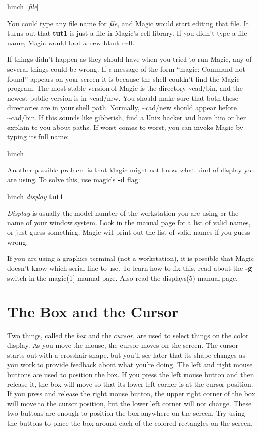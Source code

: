 \documentclass[letterpaper,twoside,12pt]{article}
\def\hinch{\hspace*{0.5in}}
\def\starti{\begin{center}\begin{tabbing}\hinch\=\hinch\=\hinch\=hinch\hinch\=\kill}
\def\endi{\end{tabbing}\end{center}}
\def\ii{\>\>\>}
\begin{document}
\starti
   \ii {\bfseries magic} [{\itshape file}]
\endi

You could type any file name for {\itshape file}, and
Magic would start editing that file.  It turns out that {\bfseries tut1}
is just a file in Magic's cell library.  If you didn't type a
file name, Magic would load a new blank cell.

If things didn't happen as they should have when you tried to
run Magic, any of several things could be wrong.  If a message
of the form ``magic: Command not found'' appears on your screen
it is because the shell couldn't find the Magic program.  The
most stable version of Magic is the directory {\ttfamily \~{}cad/bin},
and the newest public version is in {\ttfamily \~{}cad/new}.  You should
make sure that both these directories are in your shell path.
Normally, {\ttfamily \~{}cad/new} should appear before {\ttfamily \~{}cad/bin}.
If this sounds like gibberish, find a Unix hacker and have him or her
explain to you about paths.  If worst comes to worst, you can invoke
Magic by typing its full name:

\starti
   \ii {\bfseries \~{}cad/bin/magic tut1}
\endi

Another possible problem is that
Magic might not know what kind of display you are using.
To solve this, use magic's {\bfseries -d} flag:
\starti
  \ii {\bfseries magic -d} {\itshape display} {\bfseries tut1}
\endi
{\itshape Display} is usually the model number of the workstation you are using or 
the
name of your window system.  Look in the manual page for a list of valid
names, or just guess something.  Magic will print out the list of valid names
if you guess wrong.

If you are using a graphics terminal (not a workstation), 
it is possible that Magic doesn't know which serial line to use.  To learn
how to fix
this, read about the {\bfseries -g} switch in the magic(1) manual page.  Also read
the displays(5) manual page.

\section{The Box and the Cursor}

Two things, called the {\itshape box} and the {\itshape cursor}, are used
to select things on the color display.  As you move the
mouse, the cursor moves on the screen.  The cursor starts out
with a crosshair shape, but you'll see later that its shape
changes as you work to provide feedback about what you're
doing.  The left and right
mouse buttons are used to position the box.  If you press the
left mouse button and then release it, the box will move so
that its lower left corner is at the cursor position.  If
you press and release the right mouse button, the upper right
corner of the box will move to the cursor position, but the
lower left corner will not change.  These two buttons are
enough to position the box anywhere on the screen.  Try using
the buttons to place the box around each of the colored rectangles
on the screen.
\end{document}
